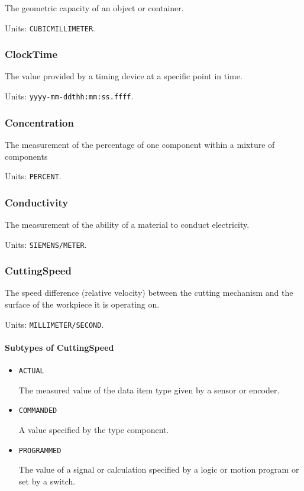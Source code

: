 The geometric capacity of an object or container.


Units: \texttt{CUBIC\textunderscore MILLIMETER}.

\subsubsection{ClockTime}
\label{sec:ClockTime}



The value provided by a timing device at a specific point in time.


Units: \texttt{yyyy-mm-ddthh:mm:ss.ffff}.

\subsubsection{Concentration}
\label{sec:Concentration}



The measurement of the percentage of one component within a mixture of components


Units: \texttt{PERCENT}.

\subsubsection{Conductivity}
\label{sec:Conductivity}



The measurement of the ability of a material to conduct electricity.


Units: \texttt{SIEMENS/METER}.

\subsubsection{CuttingSpeed}
\label{sec:CuttingSpeed}



The speed difference (relative velocity) between the cutting mechanism and the surface of the workpiece it is operating on.


Units: \texttt{MILLIMETER/SECOND}.

\paragraph{Subtypes of CuttingSpeed}\mbox{}
\label{sec:Subtypes of CuttingSpeed}

\begin{itemize}

\item \texttt{ACTUAL}


The measured value of the data item type given by a sensor or encoder.

\item \texttt{COMMANDED}


A value specified by the  type component.

\item \texttt{PROGRAMMED}


The value of a signal or calculation specified by a logic or motion program or set by a switch.


\end{itemize}

